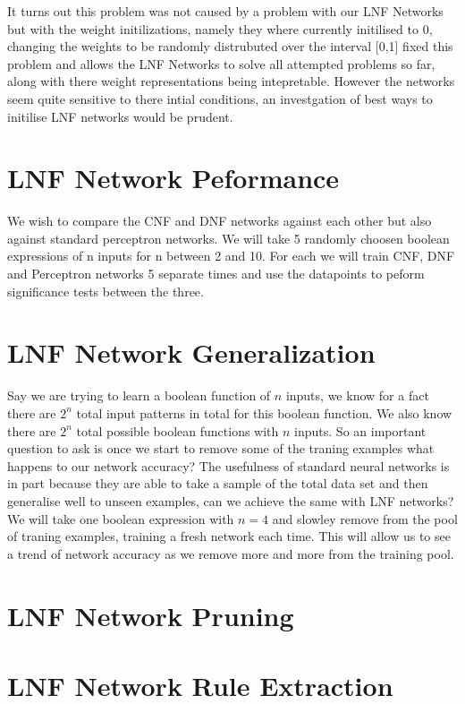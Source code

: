 \documentclass{article}
\theoremstyle{definition}
\begin{document}
It turns out this problem was not caused by a problem with our LNF Networks but with the weight initilizations, namely they where currently initilised to 0, changing the weights to be randomly distrubuted over the interval [0,1] fixed this problem and allows the LNF Networks to solve all attempted problems so far, along with there weight representations being intepretable. However the networks seem quite sensitive to there intial conditions, an investgation of best ways to initilise LNF networks would be prudent.

\section{LNF Network Peformance}
We wish to compare the CNF and DNF networks against each other but also against standard perceptron networks. We will take 5 randomly choosen boolean expressions of n inputs for n between 2 and 10. For each we will train CNF, DNF and Perceptron networks 5 separate times and use the datapoints to peform significance tests between the three.

\section{LNF Network Generalization}
Say we are trying to learn a boolean function of $n$ inputs, we know for a fact there are $2^n$ total input patterns in total for this boolean function. We also know there are $2^n$ total possible boolean functions with $n$ inputs. So an important question to ask is once we start to remove some of the traning examples what happens to our network accuracy? The usefulness of standard neural networks is in part because they are able to take a sample of the total data set and then generalise well to unseen examples, can we achieve the same with LNF networks?\\

We will take one boolean expression with $n = 4$ and slowley remove from the pool of traning examples, training a fresh network each time. This will allow us to see a trend of network accuracy as we remove more and more from the training pool.

\section{LNF Network Pruning}

\section{LNF Network Rule Extraction}

\medskip


\end{document}
